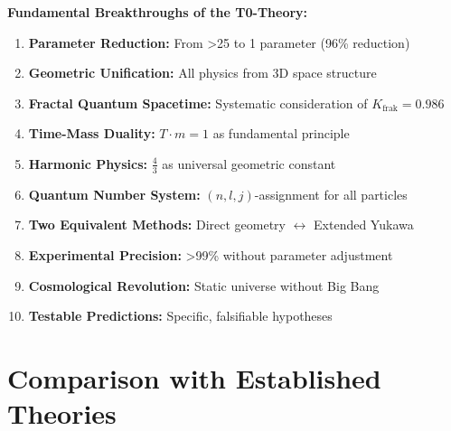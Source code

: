 \documentclass[12pt,a4paper]{article}
\begin{document}
	\begin{foundation}
		\textbf{Fundamental Breakthroughs of the T0-Theory:}
		
		\begin{enumerate}
			\item \textbf{Parameter Reduction:} From >25 to 1 parameter (96\% reduction)
			
			\item \textbf{Geometric Unification:} All physics from 3D space structure
			
			\item \textbf{Fractal Quantum Spacetime:} Systematic consideration of $K_{\text{frak}} = 0.986$
			
			\item \textbf{Time-Mass Duality:} $T \cdot m = 1$ as fundamental principle
			
			\item \textbf{Harmonic Physics:} $\frac{4}{3}$ as universal geometric constant
			
			\item \textbf{Quantum Number System:} $(n,l,j)$-assignment for all particles
			
			\item \textbf{Two Equivalent Methods:} Direct geometry $\leftrightarrow$ Extended Yukawa
			
			\item \textbf{Experimental Precision:} >99\% without parameter adjustment
			
			\item \textbf{Cosmological Revolution:} Static universe without Big Bang
			
			\item \textbf{Testable Predictions:} Specific, falsifiable hypotheses
		\end{enumerate}
	\end{foundation}
	
	\section{Comparison with Established Theories}
	
\end{document}

